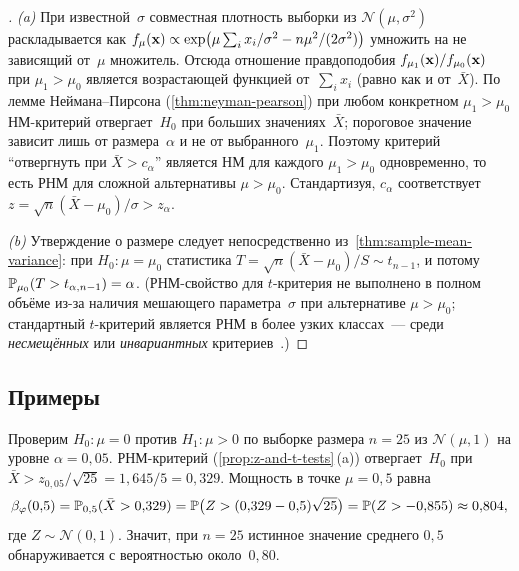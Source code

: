 \begin{proof}[]
\emph{(a)} При известной~$\sigma$ совместная плотность выборки из $\mathcal{N}(\mu, \sigma^2)$ раскладывается как $f_\mu(\mathbf{x}) \propto \exp\bigl(\mu \sum_i x_i / \sigma^2 - n \mu^2 / (2 \sigma^2)\bigr)$ умножить на не зависящий от~$\mu$ множитель. Отсюда отношение правдоподобия $f_{\mu_1}(\mathbf{x})/f_{\mu_0}(\mathbf{x})$ при $\mu_1 > \mu_0$ является возрастающей функцией от~$\sum_i x_i$ (равно как и от~$\bar X$). По лемме Неймана--Пирсона (\cref{thm:neyman-pearson}) при любом конкретном $\mu_1 > \mu_0$ НМ-критерий отвергает~$H_0$ при больших значениях~$\bar X$; пороговое значение зависит лишь от размера~$\alpha$ и не от выбранного~$\mu_1$. Поэтому критерий ``отвергнуть при $\bar X > c_\alpha$'' является НМ для каждого $\mu_1 > \mu_0$ одновременно, то есть РНМ для сложной альтернативы $\mu > \mu_0$. Стандартизуя, $c_\alpha$ соответствует $z = \sqrt n (\bar X - \mu_0)/\sigma > z_\alpha$.

\emph{(b)} Утверждение о размере следует непосредственно из~\cref{thm:sample-mean-variance}: при $H_0 : \mu = \mu_0$ статистика $T = \sqrt n (\bar X - \mu_0)/S \sim t_{n - 1}$, и потому $\mathbb{P}_{\mu_0}(T > t_{\alpha, n - 1}) = \alpha$. (РНМ-свойство для $t$-критерия не выполнено в полном объёме из-за наличия мешающего параметра~$\sigma$ при альтернативе $\mu > \mu_0$; стандартный $t$-критерий является РНМ в более узких классах~--- среди \emph{несмещённых} или \emph{инвариантных} критериев~\cite[гл.~VII]{Shiryaev1989}.)
\end{proof}

\subsection*{Примеры}

\begin{example}
\label{ex:z-test-power}
Проверим $H_0 : \mu = 0$ против $H_1 : \mu > 0$ по выборке размера $n = 25$ из $\mathcal{N}(\mu, 1)$ на уровне $\alpha = 0{,}05$. РНМ-критерий (\cref{prop:z-and-t-tests}\,(a)) отвергает~$H_0$ при $\bar X > z_{0{,}05}/\sqrt{25} = 1{,}645/5 = 0{,}329$. Мощность в точке $\mu = 0{,}5$ равна
\[
  \beta_\varphi(0{,}5) = \mathbb{P}_{0{,}5}(\bar X > 0{,}329) = \mathbb{P}\bigl(Z > (0{,}329 - 0{,}5)\sqrt{25}\bigr) = \mathbb{P}(Z > -0{,}855) \approx 0{,}804,
\]
где $Z \sim \mathcal{N}(0, 1)$. Значит, при $n = 25$ истинное значение среднего $0{,}5$ обнаруживается с вероятностью около~$0{,}80$.
\end{example}

